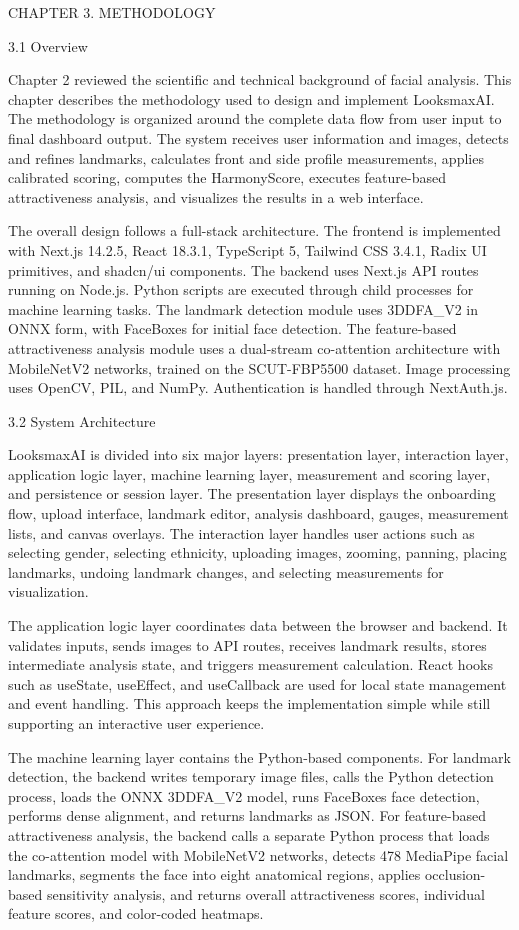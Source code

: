 CHAPTER 3. METHODOLOGY

3.1  Overview

Chapter 2 reviewed the scientific and technical background of facial analysis. This chapter describes the methodology used to design and implement LooksmaxAI. The methodology is organized around the complete data flow from user input to final dashboard output. The system receives user information and images, detects and refines landmarks, calculates front and side profile measurements, applies calibrated scoring, computes the HarmonyScore, executes feature-based attractiveness analysis, and visualizes the results in a web interface.

The overall design follows a full-stack architecture. The frontend is implemented with Next.js 14.2.5, React 18.3.1, TypeScript 5, Tailwind CSS 3.4.1, Radix UI primitives, and shadcn/ui components. The backend uses Next.js API routes running on Node.js. Python scripts are executed through child processes for machine learning tasks. The landmark detection module uses 3DDFA_V2 in ONNX form, with FaceBoxes for initial face detection. The feature-based attractiveness analysis module uses a dual-stream co-attention architecture with MobileNetV2 networks, trained on the SCUT-FBP5500 dataset. Image processing uses OpenCV, PIL, and NumPy. Authentication is handled through NextAuth.js.

3.2  System Architecture

LooksmaxAI is divided into six major layers: presentation layer, interaction layer, application logic layer, machine learning layer, measurement and scoring layer, and persistence or session layer. The presentation layer displays the onboarding flow, upload interface, landmark editor, analysis dashboard, gauges, measurement lists, and canvas overlays. The interaction layer handles user actions such as selecting gender, selecting ethnicity, uploading images, zooming, panning, placing landmarks, undoing landmark changes, and selecting measurements for visualization.

The application logic layer coordinates data between the browser and backend. It validates inputs, sends images to API routes, receives landmark results, stores intermediate analysis state, and triggers measurement calculation. React hooks such as useState, useEffect, and useCallback are used for local state management and event handling. This approach keeps the implementation simple while still supporting an interactive user experience.

The machine learning layer contains the Python-based components. For landmark detection, the backend writes temporary image files, calls the Python detection process, loads the ONNX 3DDFA_V2 model, runs FaceBoxes face detection, performs dense alignment, and returns landmarks as JSON. For feature-based attractiveness analysis, the backend calls a separate Python process that loads the co-attention model with MobileNetV2 networks, detects 478 MediaPipe facial landmarks, segments the face into eight anatomical regions, applies occlusion-based sensitivity analysis, and returns overall attractiveness scores, individual feature scores, and color-coded heatmaps.

